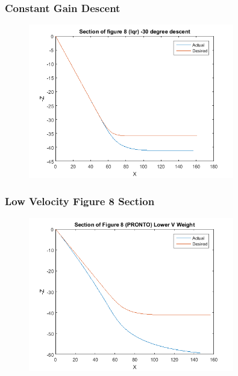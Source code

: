 \documentclass{beamer}
\begin{document}
    \begin{frame}
        \frametitle{Constant Gain Descent}
        \begin{figure}
            \centering
            \includegraphics[width=0.8\textwidth]{fig_descent_constant.png}
        \end{figure}
    \end{frame}
    \begin{frame}
        \frametitle{Low Velocity Figure 8 Section}
        \begin{figure}
            \centering
            \includegraphics[width=0.8\textwidth]{fig8_rightlow.png}
        \end{figure}
    \end{frame}
\end{document}
